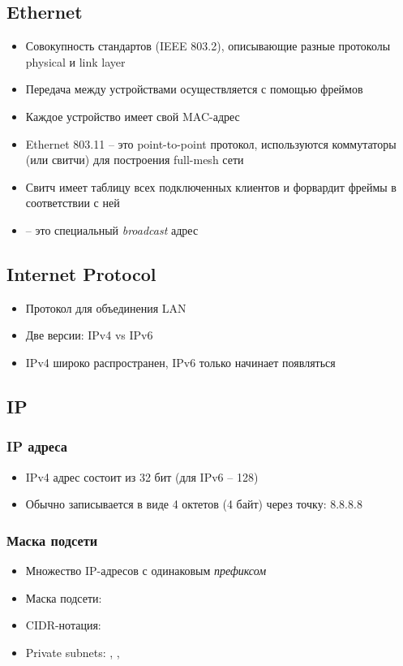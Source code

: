   \subsection{Ethernet}
    \begin{itemize}
      \item Совокупность стандартов (IEEE 803.2), описывающие разные протоколы physical и link layer
      \item Передача между устройствами осуществляется с помощью фреймов
      \item Каждое устройство имеет свой MAC-адрес
      \item Ethernet 803.11 -- это point-to-point протокол, используются коммутаторы (или свитчи) для построения full-mesh сети
      \item Свитч имеет таблицу всех подключенных клиентов и форвардит фреймы в соответствии с ней
      \item {} -- это специальный \textit{broadcast} адрес
    \end{itemize}
  
  \subsection{Internet Protocol}
    \begin{itemize}
      \item Протокол для объединения LAN
      \item Две версии: IPv4 vs IPv6
      \item IPv4 широко распространен, IPv6 только начинает появляться
    \end{itemize}
  
  \subsection{IP}
  \subsubsection{IP адреса}
    \begin{itemize}
      \item IPv4 адрес состоит из 32 бит (для IPv6 -- 128)
      \item Обычно записывается в виде 4 октетов (4 байт) через точку: 8.8.8.8
    \end{itemize}
  
  \subsubsection{Маска подсети}
    \begin{itemize}
      \item Множество IP-адресов с одинаковым \textit{префиксом}
      \item Маска подсети: 
      \item CIDR-нотация: 
      \item Private subnets: , , 
    \end{itemize}
  
